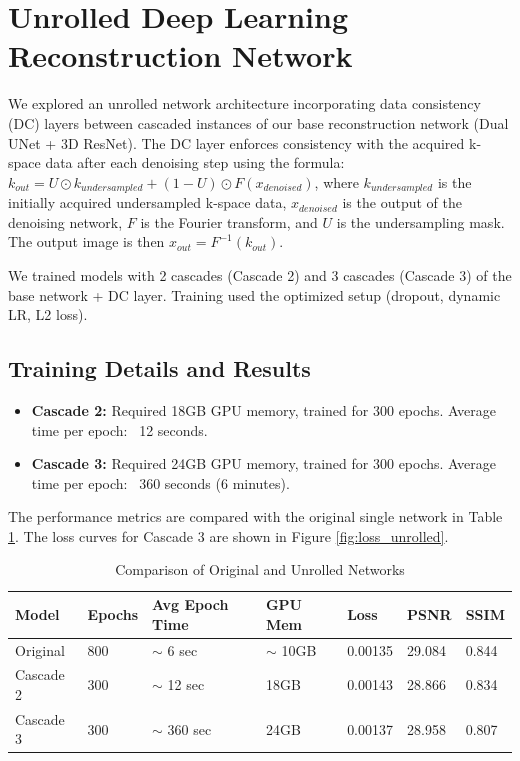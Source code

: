\documentclass{article}
\begin{document}
\section{Unrolled Deep Learning Reconstruction Network}
We explored an unrolled network architecture incorporating data consistency (DC) layers between cascaded instances of our base reconstruction network (Dual UNet + 3D ResNet). The DC layer enforces consistency with the acquired k-space data after each denoising step using the formula:
$k_{out} = U \odot k_{undersampled} + (1 - U) \odot F(x_{denoised})$, where $k_{undersampled}$ is the initially acquired undersampled k-space data, $x_{denoised}$ is the output of the denoising network, $F$ is the Fourier transform, and $U$ is the undersampling mask. The output image is then $x_{out} = F^{-1}(k_{out})$.

We trained models with 2 cascades (Cascade 2) and 3 cascades (Cascade 3) of the base network + DC layer. Training used the optimized setup (dropout, dynamic LR, L2 loss).

\subsection{Training Details and Results}
\begin{itemize}
  \item \textbf{Cascade 2:} Required 18GB GPU memory, trained for 300 epochs. Average time per epoch: ~12 seconds.
  \item \textbf{Cascade 3:} Required 24GB GPU memory, trained for 300 epochs. Average time per epoch: ~360 seconds (6 minutes).
\end{itemize}
The performance metrics are compared with the original single network in Table \ref{tab:unrolled_compare}. The loss curves for Cascade 3 are shown in Figure \ref{fig:loss_unrolled}.

\begin{table}[H]
  \caption{Comparison of Original and Unrolled Networks}
  \label{tab:unrolled_compare}
  \centering
  \begin{tabular}{lllllll}
    \toprule
    Model     & Epochs & Avg Epoch Time & GPU Mem     & Loss    & PSNR   & SSIM  \\
    \midrule
    Original  & 800    & $\sim$ 6 sec   & $\sim$ 10GB & 0.00135 & 29.084 & 0.844 \\
    Cascade 2 & 300    & $\sim$ 12 sec  & 18GB        & 0.00143 & 28.866 & 0.834 \\
    Cascade 3 & 300    & $\sim$ 360 sec & 24GB        & 0.00137 & 28.958 & 0.807 \\
    \bottomrule
  \end{tabular}
\end{table}
\end{document}
